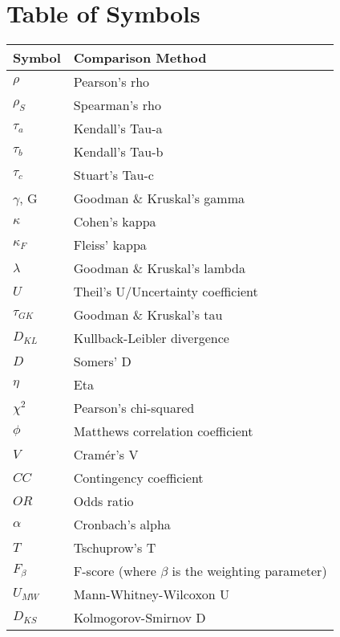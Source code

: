 \documentclass[11pt]{article}
\begin{document}
\section{Table of Symbols}
\begin{table}[h]
\centering
\begin{tabular}{|l|l|}
\hline
\textbf{Symbol} & \textbf{Comparison Method} \\ \hline
$\rho$              & Pearson's rho \\ \hline
$\rho_S$            & Spearman's rho \\ \hline
$\tau_a$            & Kendall's Tau-a \\ \hline
$\tau_b$            & Kendall's Tau-b \\ \hline
$\tau_c$            & Stuart's Tau-c \\ \hline
$\gamma$, G         & Goodman \& Kruskal's gamma\\ \hline
$\kappa$            & Cohen's kappa \\ \hline
$\kappa_F$          & Fleiss' kappa \\ \hline
$\lambda$           & Goodman \& Kruskal's lambda\\ \hline
$U$                 & Theil's U/Uncertainty coefficient\\ \hline
$\tau_{GK}$         & Goodman \& Kruskal's tau\\ \hline
$D_{KL}$            & Kullback-Leibler divergence\\ \hline
$D$                 & Somers' D\\ \hline
$\eta$              & Eta \\ \hline
$\chi^2$            & Pearson's chi-squared\\ \hline
$\phi$              & Matthews correlation coefficient\\ \hline
$V$                 & Cram\'er's V\\ \hline
$CC$                & Contingency coefficient \\ \hline
$OR$                & Odds ratio\\ \hline
$\alpha$            & Cronbach's alpha\\ \hline
$T$                 & Tschuprow's T\\ \hline
$F_\beta$           & F-score (where $\beta$ is the weighting parameter)\\ \hline
$U_{MW}$            & Mann-Whitney-Wilcoxon U\\ \hline
$D_{KS}$            & Kolmogorov-Smirnov D\\ \hline

\end{tabular}
\end{table}
\end{document}

